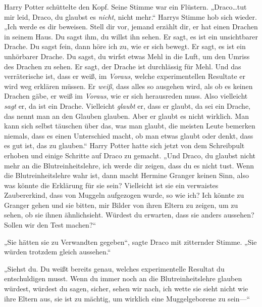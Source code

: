 Harry Potter schüttelte den Kopf. Seine Stimme war ein Flüstern. „Draco…tut mir leid, Draco, du glaubst es \emph{nicht}, nicht mehr.“ Harrys Stimme hob sich wieder. „Ich werde es dir beweisen. Stell dir vor, jemand erzählt dir, er hat einen Drachen in seinem Haus. Du sagst ihm, du willst ihn sehen. Er sagt, es ist ein unsichtbarer Drache. Du sagst fein, dann höre ich zu, wie er sich bewegt. Er sagt, es ist ein unhörbarer Drache. Du sagst, du wirfst etwas Mehl in die Luft, um den Umriss des Drachen zu sehen. Er sagt, der Drache ist durchlässig für Mehl. Und das verräterische ist, dass er weiß, im \emph{Voraus}, welche experimentellen Resultate er wird weg erklären müssen. Er \emph{weiß}, dass alles so ausgehen wird, als ob es keinen Drachen gäbe, er weiß im \emph{Voraus}, wie er sich herausreden muss. Also vielleicht \emph{sagt} er, da ist ein Drache. Vielleicht \emph{glaubt} er, dass er glaubt, da sei ein Drache, das nennt man an den Glauben glauben. Aber er glaubt es nicht wirklich. Man kann sich selbst täuschen über das, was man glaubt, die meisten Leute bemerken niemals, dass es einen Unterschied macht, ob man etwas glaubt oder denkt, dass es gut ist, das zu glauben.“ Harry Potter hatte sich jetzt von dem Schreibpult erhoben und einige Schritte auf Draco zu gemacht. „Und Draco, du glaubst nicht mehr an die Blutreinheitslehre, ich werde dir zeigen, dass du es nicht tust. Wenn die Blutreinheitslehre wahr ist, dann macht Hermine Granger keinen Sinn, also was könnte die Erklärung für sie sein? Vielleicht ist sie ein verwaistes Zaubererkind, dass von Muggeln aufgezogen wurde, so wie ich? Ich könnte zu Granger gehen und sie bitten, mir Bilder von ihren Eltern zu zeigen, um zu sehen, ob sie ihnen ähnlichsieht. Würdest du erwarten, dass sie anders aussehen? Sollen wir den Test machen?“

„Sie hätten sie zu Verwandten gegeben“, sagte Draco mit zitternder Stimme. „Sie würden trotzdem gleich aussehen.“

„Siehst du. Du weißt bereits genau, welches experimentelle Resultat du entschuldigen musst. Wenn du immer noch an die Blutreinheitslehre glauben würdest, würdest du sagen, sicher, sehen wir nach, ich wette sie sieht nicht wie ihre Eltern aus, sie ist zu mächtig, um wirklich eine Muggelgeborene zu sein—“

